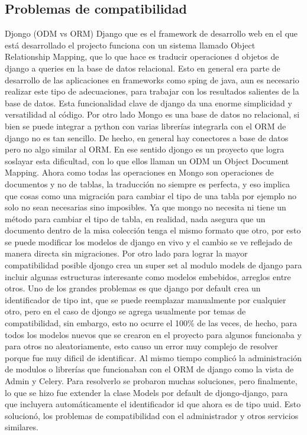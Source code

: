 \subsection{Problemas de compatibilidad}
Djongo
(ODM vs ORM)
Django que es el framework de desarrollo web en el que está desarrollado el projecto funciona con un sistema llamado Object Relationship Mapping, que lo que hace es traducir operaciones d objetos de django a queries en la base de datos relacional. Esto en general era parte de desarrollo de las aplicaciones en frameworks como sping de java, aun es necesario realizar este tipo de adecuaciones, para trabajar con los resultados salientes de la base de datos. Esta funcionalidad clave de django da una enorme simplicidad y versatilidad al código. Por otro lado Mongo es una base de datos no relacional, si bien se puede integrar a python con varias librerías integrarla con el ORM de django no es tan sencillo. De hecho, en general hay conectores a base de datos pero no algo similar al ORM. En ese sentido djongo es un proyecto que logra soslayar esta dificultad, con lo que ellos llaman un ODM un Object Document Mapping. Ahora como todas las operaciones en Mongo son operaciones de documentos y no de tablas, la traducción no siempre es perfecta, y eso implica que cosas como una migración para cambiar el tipo de una tabla por ejemplo no solo no sean necesarias sino imposibles. Ya que mongo no necesita ni tiene un método para cambiar el tipo de tabla, en realidad, nada asegura que un documento dentro de la misa colección tenga el mismo formato que otro, por esto se puede modificar los modelos de django en vivo y el cambio se ve reflejado de manera directa sin migraciones.
Por otro lado para lograr la mayor compatibilidad posible djongo crea un super set al modulo models de django para incluir algunas estructuras interesante como modelos embebidos, arreglos entre otros.
Uno de los grandes problemas es que django por default crea un identificador de tipo int, que se puede reemplazar manualmente por cualquier otro, pero en el caso de djongo se agrega usualmente por temas de compatibilidad, sin embargo, esto no ocurre el 100\% de las veces, de hecho, para todos los modelos nuevos que se crearon en el proyecto para algunos funcionaba y para otros no aleatoriamente, esto causo un error muy complejo de resolver porque fue muy dificil de identificar. Al mismo tiempo complicó la administración de modulos o librerías que funcionaban con el ORM de django como la vista de Admin y Celery.
Para resolverlo se probaron muchas soluciones, pero finalmente, lo que se hizo fue extender la clase Models por default de djongo-django, para que incluyera automáticamente el identificador id que ahora es de tipo uuid. Esto solucionó, los problemas de compatibilidad con el administrador y otros servicios similares.

